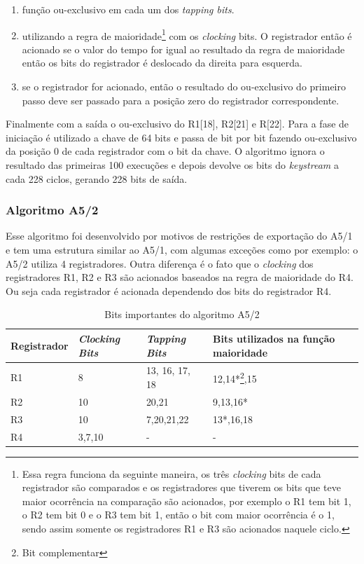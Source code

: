 \begin{enumerate}
\item função ou-exclusivo em cada um dos \textit{tapping bits}.
\item utilizando a regra de maioridade\footnote{Essa regra funciona da seguinte maneira, os três \textit{clocking} bits de cada registrador são comparados e os registradores que tiverem os bits que teve maior ocorrência na comparação são acionados, por exemplo o R1 tem bit 1, o R2 tem bit 0 e o R3 tem bit 1, então o bit com maior ocorrência é o 1, sendo assim somente os registradores R1 e R3 são acionados naquele ciclo.} com os \textit{clocking} bits. O registrador então é acionado se o valor do tempo for igual ao resultado da regra de maioridade então os bits do registrador é deslocado da direita para esquerda.
\item se o registrador for acionado, então o resultado do ou-exclusivo do primeiro passo deve ser passado para a posição zero do registrador correspondente.
\end{enumerate}

Finalmente com a saída o ou-exclusivo do R1[18], R2[21] e R[22]. Para a fase de iniciação é utilizado a chave de 64 bits e passa de bit por bit fazendo ou-exclusivo da posição 0 de cada registrador com o bit da chave. O algoritmo ignora o resultado das primeiras 100 execuções e depois devolve os bits do \textit{keystream} a cada 228 ciclos, gerando 228 bits de saída.

\subsubsection{Algoritmo A5/2}
\label{algorithm-a52}

Esse algoritmo foi desenvolvido por motivos de restrições de exportação do A5/1 e tem uma estrutura similar ao A5/1, com algumas exceções como por exemplo: o A5/2 utiliza 4 registradores. Outra diferença é o fato que o \textit{clocking} dos registradores R1, R2 e R3 são acionados baseados na regra de maioridade do R4. Ou seja cada registrador é acionada dependendo dos bits do registrador R4. 

\begin{table}[h]
\centering
	\begin{tabular}{|l|l|l|l|}
		\hline
		Registrador & \textit{Clocking Bits} & \textit{Tapping Bits} & Bits utilizados na função maioridade \\ \hline
		R1 & 8 & 13, 16, 17, 18  & 12,14*\footnote{Bit complementar},15\\ \hline
		R2 & 10 & 20,21 & 9,13,16*\\ \hline
		R3 & 10 & 7,20,21,22 & 13*,16,18\\ \hline	
		R4 & 3,7,10 & - & -\\ \hline
	\end{tabular}
	\caption{Bits importantes do algoritmo A5/2}
\end{table}

